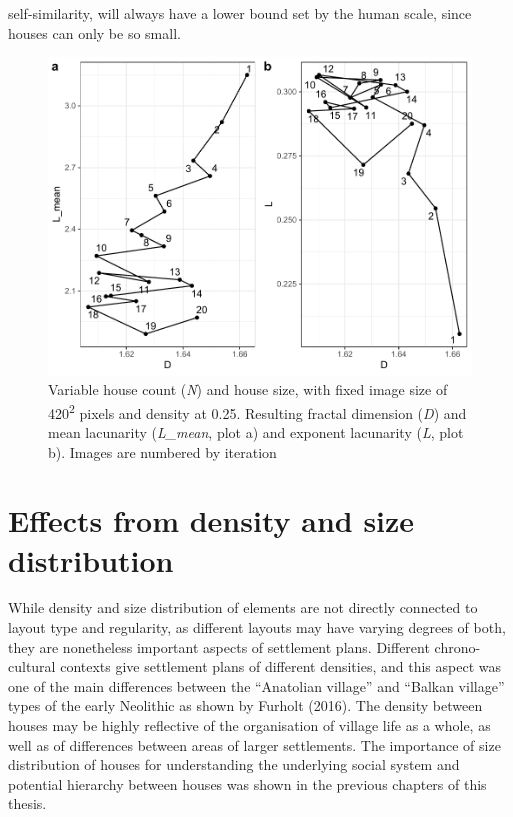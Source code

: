 \documentclass[
  12pt,
]{book}
\begin{document}
self-similarity, will always have a lower bound set by the human scale, since houses can only be so small.



\begin{figure}

{\centering \includegraphics[width=0.9\linewidth]{bookdown-demo_files/figure-latex/08-N-HS-1} 

}

\caption{Variable house count (\emph{N}) and house size, with fixed image size of 420\textsuperscript{2} pixels and density at 0.25. Resulting fractal dimension (\emph{D}) and mean lacunarity (\emph{L\_mean}, plot a) and exponent lacunarity (\emph{L}, plot b). Images are numbered by iteration}\label{fig:08-N-HS}
\end{figure}

\FloatBarrier

\hypertarget{effects-from-density-and-size-distribution}{%
\section{Effects from density and size distribution}\label{effects-from-density-and-size-distribution}}

While density and size distribution of elements are not directly connected to layout type and regularity, as different layouts may have varying degrees of both, they are nonetheless important aspects of settlement plans. Different chrono-cultural contexts give settlement plans of different densities, and this aspect was one of the main differences between the ``Anatolian village'' and ``Balkan village'' types of the early Neolithic as shown by Furholt (2016). The density between houses may be highly reflective of the organisation of village life as a whole, as well as of differences between areas of larger settlements. The importance of size distribution of houses for understanding the underlying social system and potential hierarchy between houses was shown in the previous chapters of this thesis.
\end{document}
